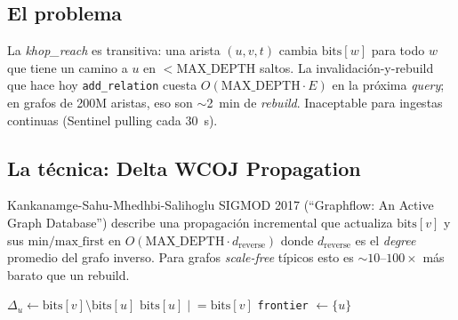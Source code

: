 \subsection{El problema}

La \emph{khop\_reach} es transitiva: una arista \((u, v, t)\) cambia
\(\mathrm{bits}[w]\) para todo \(w\) que tiene un camino a \(u\) en
\(< \mathrm{MAX\_DEPTH}\) saltos. La invalidación-y-rebuild que hace
hoy \texttt{add\_relation} cuesta \(O(\mathrm{MAX\_DEPTH} \cdot E)\)
en la próxima \emph{query}; en grafos de 200M aristas, eso son
$\sim$2~min de \emph{rebuild}. Inaceptable para ingestas continuas
(Sentinel pulling cada 30~s).

\subsection{La técnica: Delta WCOJ Propagation}

Kankanamge-Sahu-Mhedhbi-Salihoglu SIGMOD 2017
(``Graphflow: An Active Graph Database'') describe una propagación
incremental que actualiza \(\mathrm{bits}[v]\) y sus
\(\mathrm{min/max\_first}\) en
\(O(\mathrm{MAX\_DEPTH} \cdot d_{\mathrm{reverse}})\) donde
\(d_{\mathrm{reverse}}\) es el \emph{degree} promedio del grafo
inverso. Para grafos \emph{scale-free} típicos esto es
\(\sim 10\)--$100\times$ más barato que un rebuild.

\begin{algorithm}[H]
\caption{\texttt{khop\_reach.delta\_update(u, v, t)} — esquema}
\BlankLine
{}
\(\Delta_u \leftarrow \mathrm{bits}[v] \setminus \mathrm{bits}[u]\)\;
\(\mathrm{bits}[u] \mathrel{|}\!= \mathrm{bits}[v]\)\;
\BlankLine
{}
\texttt{frontier} \(\leftarrow \{u\}\)\;
\end{algorithm}

